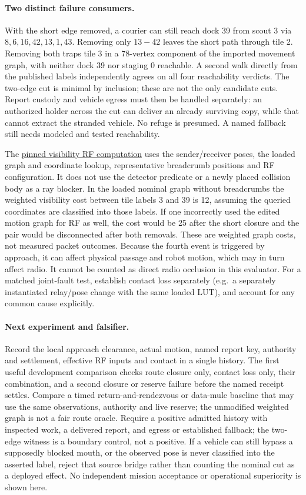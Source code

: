 \documentclass[11pt]{article}
\begin{document}
\paragraph{Two distinct failure consumers.}
With the short edge removed, a courier can still reach dock 39 from
scout 3 via $8,6,16,42,13,1,43$. Removing only $13\!-\!42$ leaves the
short path through tile 2. Removing both traps tile 3 in a 78-vertex
component of the imported movement graph, with neither dock 39 nor
staging 0 reachable. A second walk directly from the published labels
independently agrees on all four reachability verdicts. The two-edge
cut is minimal by inclusion; these are not the only candidate cuts.
Report custody and vehicle egress must then be handled separately:
an authorized holder across the cut can deliver an already surviving
copy, while that cannot extract the stranded vehicle. No refuge is
presumed. A named fallback still needs modeled and tested reachability.

The \href{https://github.com/osrf/subt/blob/083c6a8acb0c25aa1a35e34517e628cd3b52ae77/subt_ign/src/VisibilityRfModel.cc}
{pinned visibility RF computation} uses the sender/receiver poses,
the loaded graph and coordinate lookup, representative breadcrumb
positions and RF configuration. It does not use the detector
predicate or a newly placed collision body as a ray blocker. In the
loaded nominal graph without breadcrumbs the weighted visibility cost
between tile labels 3 and 39 is 12, assuming the queried coordinates
are classified into those labels. If one incorrectly used the edited
motion graph for RF as well, the cost would be 25 after the short
closure and the pair would be disconnected after both removals.
These are weighted graph costs, not measured packet outcomes.
Because the fourth event is triggered by approach, it can affect
physical passage and robot motion, which may in turn affect radio.
It cannot be counted as direct radio occlusion in this evaluator.
For a matched joint-fault test, establish contact loss separately
(e.g.\ a separately instantiated relay/pose change with the same
loaded LUT), and account for any common cause explicitly.

\paragraph{Next experiment and falsifier.}
Record the local approach clearance, actual motion, named report key,
authority and settlement, effective RF inputs and contact in a
single history. The first useful development comparison checks route
closure only, contact loss only, their combination, and a second
closure or reserve failure before the named receipt settles. Compare
a timed return-and-rendezvous or data-mule baseline that may use the
same observations, authority and live reserve; the unmodified
weighted graph is not a fair route oracle. Require a positive
admitted history with inspected work, a delivered report, and
egress or established fallback; the two-edge witness is a
boundary control, not a positive. If a vehicle can still bypass a
supposedly blocked mouth, or the observed pose is never classified
into the asserted label, reject that source bridge rather than
counting the nominal cut as a deployed effect. No independent
mission acceptance or operational superiority is shown here.
\end{document}
